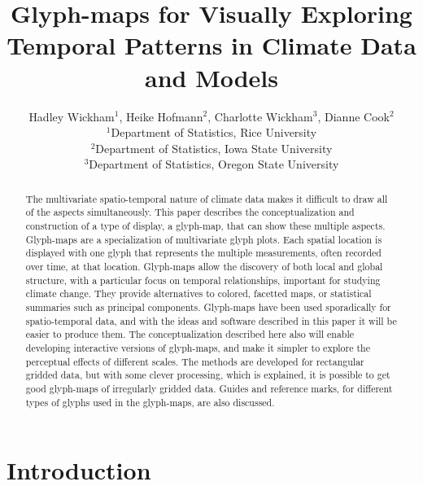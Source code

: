 \documentclass[oneside]{article}
\begin{document}
\doublespacing
\title{Glyph-maps for Visually Exploring Temporal Patterns in Climate Data and Models}
\author{Hadley Wickham$^1$, Heike Hofmann$^2$, Charlotte Wickham$^3$, Dianne Cook$^2$\\
$^1$Department of Statistics, Rice University\\
$^2$Department of Statistics, Iowa State University\\
$^3$Department of Statistics, Oregon State University}
\date{}

\maketitle

\begin{abstract}

The multivariate spatio-temporal nature of climate data makes it difficult to draw all of the aspects simultaneously. This paper describes the conceptualization and construction of a type of display, a glyph-map, that can show these multiple aspects. Glyph-maps are a specialization of multivariate glyph plots. Each spatial location is displayed with one glyph that represents the multiple measurements, often recorded over time, at that location. Glyph-maps allow the discovery of both local and global structure, with a particular focus on temporal relationships, important for studying climate change. They provide alternatives to colored, facetted maps, or statistical summaries such as principal components. Glyph-maps have been used sporadically for spatio-temporal data, and with the ideas and software described in this paper it will be easier to produce them. The conceptualization described here also will enable developing interactive versions of glyph-maps, and make it simpler to explore the perceptual effects of different scales. The methods are developed for rectangular gridded data, but with some clever processing, which is explained, it is possible to get good glyph-maps of irregularly gridded data. Guides and reference marks, for different types of glyphs used in the glyph-maps, are also discussed.

\end{abstract}

\section{Introduction}
\end{document}
